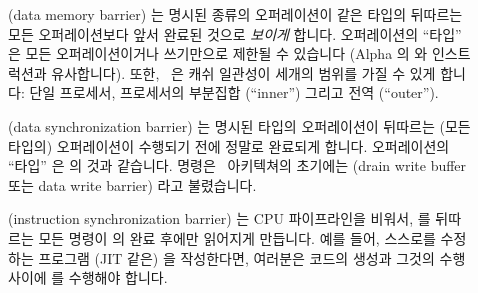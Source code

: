 \fi

\begin{description}
\item	[] (data memory barrier) 는 명시된 종류의 오퍼레이션이 같은
	타입의 뒤따르는 모든 오퍼레이션보다 앞서 완료된 것으로 \emph{보이게}
	합니다.
	오퍼레이션의 ``타입'' 은 모든 오퍼레이션이거나 쓰기만으로 제한될 수
	있습니다 (Alpha 의  와 \Power{}  인스트럭션과
	유사합니다).
	또한, \ARM\ 은 캐쉬 일관성이 세개의 범위를 가질 수 있게 합니다: 단일
	프로세서, 프로세서의 부분집합 (``inner'') 그리고 전역 (``outer'').
\item	[] (data synchronization barrier) 는 명시된 타입의
	오퍼레이션이 뒤따르는 (모든 타입의) 오퍼레이션이 수행되기 전에 정말로
	완료되게 합니다.
	오퍼레이션의 ``타입'' 은  의 것과 같습니다.
	 명령은 \ARM\ 아키텍쳐의 초기에는  (drain write buffer
	또는 data write barrier) 라고 불렸습니다.
\item	[] (instruction synchronization barrier) 는 CPU 파이프라인을
	비워서,  를 뒤따르는 모든 명령이  의 완료 후에만
	읽어지게 만듭니다.
	예를 들어, 스스로를 수정하는 프로그램 (JIT 같은) 을 작성한다면,
	여러분은 코드의 생성과 그것의 수행 사이에  를 수행해야 합니다.

\end{description}

